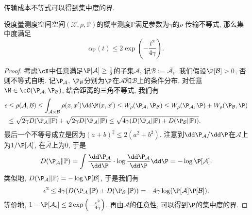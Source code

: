 传输成本不等式可以得到集中度的界. 
\begin{theorem}[从传输成本到集中度]
	设度量测度空间空间$(\mathcal{X}, \rho, \mathbb{P})$的概率测度$\mathbb{P}$满足参数为$\gamma$的$\rho$-传输不等式, 那么集中度满足
	\begin{equation*}
		\alpha_{\mathbb{P}}(t)
		\leq 2 \exp \left(- \frac{t^2}{4 \gamma} \right). 
	\end{equation*}
\end{theorem}
\begin{proof}
	考虑$\cX$中任意满足$\P[\mathcal{A}] \geq \frac{1}{2}$的子集$\mathcal{A}$, 记$\mathcal{B} := \overline{\mathcal{A}_{\epsilon}}$. 
	我们假设$\P[\mathcal{B}] > 0$, 否则不等式自明. 
	记$\P_{\mathcal{A}}$, $\P_{\mathcal{B}}$分别为$\P$在$\mathcal{A}$和$\mathcal{B}$上的条件分布, 对任意$\M \in \cC(\P_{\mathcal{A}}, \P_{\mathcal{B}})$, 结合距离的三角不等式, 我们有
	\begin{align*}
		\epsilon
		& \leq \rho(\mathcal{A}, \mathcal{B})
		\leq \int_{\mathcal{A} \times \mathcal{B}} \rho(x, x') \dd \M(x, x')
		\leq W_{\rho}(\P_{\mathcal{A}}, \P_{\mathcal{B}}) 
		\leq W_{\rho}(\P_{\mathcal{A}}, \P) + W_{\rho}(\P_{\mathcal{B}}, \P) \\
		& \leq \sqrt{2 \gamma D(\P_{\mathcal{A}} \| \mathbb{P})} + \sqrt{2 \gamma D(\P_{\mathcal{A}} \| \mathbb{P})} 
		\leq \sqrt{4 \gamma (D(\P_{\mathcal{A}} \| \mathbb{P}) + D(\P_{\mathcal{B}} \| \mathbb{P}))}. 
	\end{align*}
	最后一个不等号成立是因为$(a+b)^2 \leq 2 (a^2 + b^2)$. 
	注意到$\dd \P_{\mathcal{A}} / \dd \P$在$\mathcal{A}$上为$1 / \P[\mathcal{A}]$, 在$\overline{\mathcal{A}}$上为$0$, 于是
	\begin{equation*}
		D(\P_{\mathcal{A}} \| \mathbb{P})
		= \int \frac{\dd \P_{\mathcal{A}}}{\dd \P}  \cdot \log \frac{\dd \P_{\mathcal{A}}}{\dd \P} \dd \P 
		= - \log \P[\mathcal{A}]. 
	\end{equation*}
	类似地, $D(\P_{\mathcal{A}} \| \mathbb{P}) = - \log \P[\mathcal{B}]$, 于是我们有
	\begin{equation*}
		\epsilon^2 
		\leq 4 \gamma (D(\P_{\mathcal{A}} \| \mathbb{P}) + D(\P_{\mathcal{B}} \| \mathbb{P}))
		= - 4 \gamma \log (\P[\mathcal{A}] \P[\mathcal{B}]). 
	\end{equation*}
	等价地, $1 - \P[\mathcal{A}_{\epsilon}] \leq 2 \exp \left( -\frac{\epsilon^2}{4 \gamma} \right)$. 
	再由$\mathcal{A}$的任意性, 可以得到$\P$的集中度的界. 
	
	
\end{proof}


